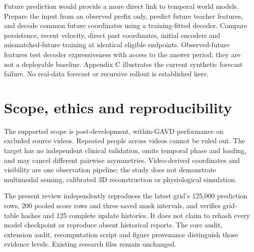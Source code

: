 \documentclass{article}
\begin{document}
Future prediction would provide a more direct link to temporal world models. Prepare the input from an observed prefix only, predict future teacher features, and decode common future coordinates using a training-fitted decoder. Compare persistence, recent velocity, direct past coordinates, initial encoders and mismatched-future training at identical eligible endpoints. Observed-future features test decoder expressiveness with access to the answer period; they are not a deployable baseline. Appendix C illustrates the current synthetic forecast failure. No real-data forecast or recursive rollout is established here.

\section{Scope, ethics and reproducibility}\label{scope-ethics-and-reproducibility}

The supported scope is post-development, within-GAVD performance on excluded source videos. Repeated people across videos cannot be ruled out. The target has no independent clinical validation, omits temporal phase and loading, and may cancel different pairwise asymmetries. Video-derived coordinates and visibility are one observation pipeline; the study does not demonstrate multimodal sensing, calibrated 3D reconstruction or physiological simulation.

The present review independently reproduces the latest grid's 125,000 prediction rows, 200 pooled score rows and three saved mask intervals, and verifies grid-table hashes and 125 complete update histories. It does not claim to rehash every model checkpoint or reproduce absent historical reports. The {core audit}, {extension audit}, {recomputation script} and {figure provenance} distinguish those evidence levels. Existing research files remain unchanged.
\end{document}
